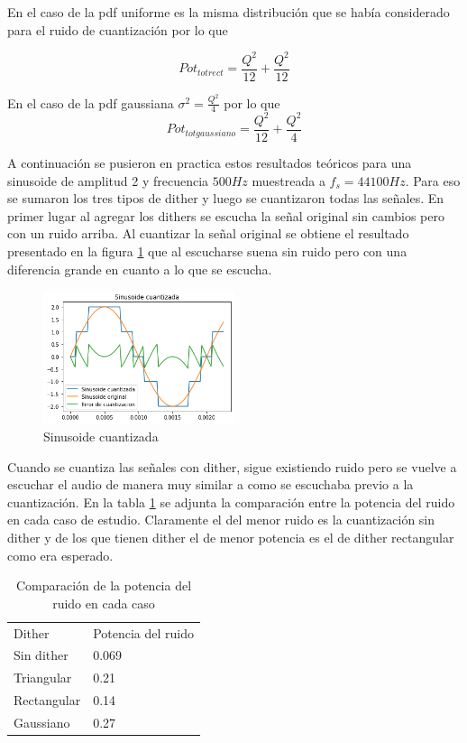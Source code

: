 \documentclass[a4paper]{article}
\begin{document}
\newline
En el caso de la pdf uniforme es la misma distribución que se había considerado para el ruido de cuantización por lo que 

$$
Pot_{tot rect} = \frac{Q^2}{12} + \frac{Q^2}{12}
$$

\newline
En el caso de la pdf gaussiana $\sigma^2 = \frac{Q^2}{4}$ por lo que 
$$
Pot_{tot gaussiano} = \frac{Q^2}{12} + \frac{Q^2}{4}
$$

\newline
A continuación se pusieron en practica estos resultados teóricos para una sinusoide de amplitud 2 y  frecuencia $500Hz$ muestreada a $f_s = 44100Hz$. Para eso se sumaron los tres tipos de dither y luego se cuantizaron todas las señales. En primer lugar al agregar los dithers se escucha la señal original sin cambios pero con un ruido arriba. Al cuantizar la señal original se obtiene el resultado presentado en la figura \ref{sinusoide_c} que al escucharse suena sin ruido pero con una diferencia grande en cuanto a lo que se escucha. 

\begin{figure}[h]
\centering
\includegraphics[width=0.5\textwidth]{sinusoide_c.png}
\caption{Sinusoide cuantizada}
\label{sinusoide_c}
\end{figure}

Cuando se cuantiza las señales con dither, sigue existiendo ruido pero se vuelve a escuchar el audio de manera muy similar a como se escuchaba previo a la cuantización. En la tabla \ref{tabla} se adjunta la comparación entre la potencia del ruido en cada caso de estudio. Claramente el del menor ruido es la cuantización sin dither y de los que tienen dither el de menor potencia es el de dither rectangular como era esperado. 

\begin{table}[]
\centering
\begin{tabular}{ll}
Dither & Potencia del ruido \\
Sin dither & 0.069 \\
Triangular & 0.21 \\
Rectangular & 0.14 \\
Gaussiano & 0.27
\end{tabular}
\label{tabla}
\caption{Comparación de la potencia del ruido en cada caso}
\end{table}
\end{document}
